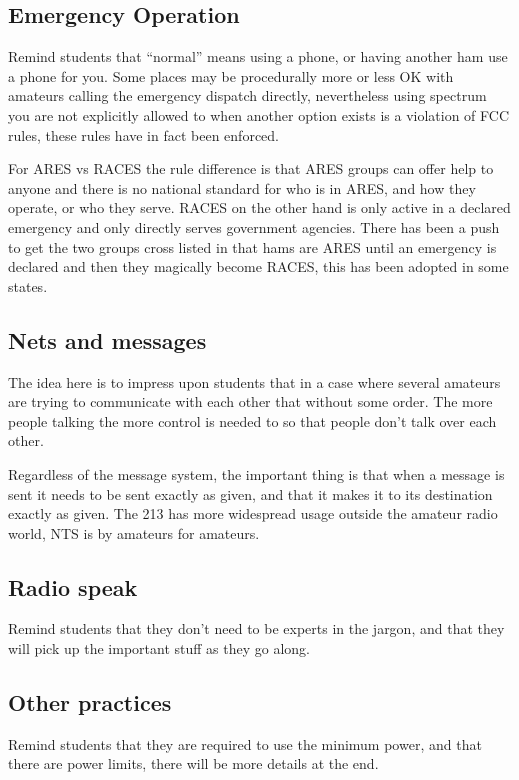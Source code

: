\documentclass[12pt,letterpaper]{report}
\begin{document}
\subsection*{Emergency Operation}
Remind students that ``normal'' means using a phone, or having another ham use a phone for you. Some places may be procedurally more or less OK with amateurs calling the emergency dispatch directly, nevertheless using spectrum you are not explicitly allowed to when another option exists is a violation of FCC rules, these rules have in fact been enforced. 

For ARES vs RACES the rule difference is that ARES groups can offer help to anyone and there is no national standard for who is in ARES, and how they operate, or who they serve. RACES on the other hand is only active in a declared emergency and only directly serves government agencies. There has been a push to get the two groups cross listed in that hams are ARES until an emergency is declared and then they magically become RACES, this has been adopted in some states.

\subsection*{Nets and messages}
The idea here is to impress upon students that in a case where several amateurs are trying to communicate with each other that without some order. The more people talking the more control is needed to so that people don't talk over each other.

Regardless of the message system, the important thing is that when a message is sent it needs to be sent exactly as given, and that it makes it to its destination exactly as given. The 213 has more widespread usage outside the amateur radio world, NTS is by amateurs for amateurs. 

\subsection*{Radio speak}
Remind students that they don't need to be experts in the jargon, and that they will pick up the important stuff as they go along.

\subsection*{Other practices}
Remind students that they are required to use the minimum power, and that there are power limits, there will be more details at the end.
\end{document}
